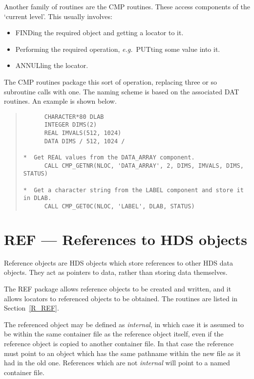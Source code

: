 Another family of routines are the CMP routines.
These access components of the `current level'.
This usually involves:

\begin{itemize}

\item FINDing the required object and getting a locator to it.

\item Performing the required operation, {\em e.g.}\ PUTting some value into it.

\item ANNULling the locator.

\end{itemize}

The CMP routines package this sort of operation, replacing three or so
subroutine calls with one.
The naming scheme is based on the associated DAT routines.
An example is shown below.

\begin{quote}

\begin{small}
\begin{verbatim}
      CHARACTER*80 DLAB
      INTEGER DIMS(2)
      REAL IMVALS(512, 1024)
      DATA DIMS / 512, 1024 /

*  Get REAL values from the DATA_ARRAY component.
      CALL CMP_GETNR(NLOC, 'DATA_ARRAY', 2, DIMS, IMVALS, DIMS, STATUS)

*  Get a character string from the LABEL component and store it in DLAB.
      CALL CMP_GET0C(NLOC, 'LABEL', DLAB, STATUS)
\end{verbatim}
\end{small}

\end{quote}

\section{REF --- References to HDS objects}
\label{S_ref}

Reference objects are HDS objects which store references to other HDS data
objects.
They act as pointers to data, rather than storing data themselves.

The REF package allows reference objects to be created and written, and it
allows locators to referenced objects to be obtained.
The routines are listed in Section~\ref{R_REF}.

The referenced object may be defined as {\em internal\/}, in which case it is
assumed to be within the same container file as the reference object itself,
even if the reference object is copied to another container file.
In that case the reference must point to an object which has the same pathname
within the new file as it had in the old one.
References which are not {\em internal\/} will point to a named container file.

